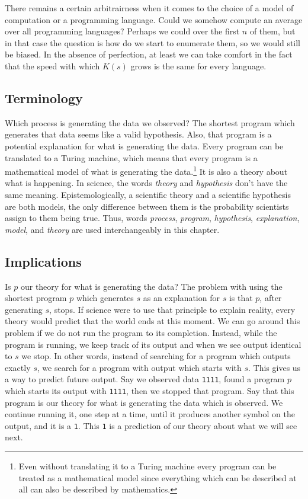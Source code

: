 There remains a certain arbitrairness when it comes to the choice of a model of computation or a programming language.
Could we somehow compute an average over all programming languages?
Perhaps we could over the first $n$ of them, but in that case the question is how do we start to enumerate them, so we would still be biased.
In the absence of perfection, at least we can take comfort in the fact that the speed with which $K(s)$ grows is the same for every language.

\newpage

\subsection{Terminology}

Which process is generating the data we observed?
The shortest program which generates that data seems like a valid hypothesis.
Also, that program is a potential explanation for what is generating the data.
Every program can be translated to a Turing machine, which means that every program is a mathematical model of what is generating the data.\footnote{Even without translating it to a Turing machine every program can be treated as a mathematical model since everything which can be described at all can also be described by mathematics.}
It is also a theory about what is happening.
In science, the words \textit{theory} and \textit{hypothesis} don't have the same meaning.
Epistemologically, a scientific theory and a scientific hypothesis are both models, the only difference between them is the probability scientists assign to them being true.
Thus, words \textit{process}, \textit{program}, \textit{hypothesis}, \textit{explanation}, \textit{model}, and \textit{theory} are used interchangeably in this chapter.

\newpage

\subsection{Implications}

Is $p$ our theory for what is generating the data?
The problem with using the shortest program $p$ which generates $s$ as an explanation for $s$ is that $p$, after generating $s$, stops.
If science were to use that principle to explain reality, every theory would predict that the world ends at this moment.
We can go around this problem if we do not run the program to its completion.
Instead, while the program is running, we keep track of its output and when we see output identical to $s$ we stop.
In other words, instead of searching for a program which outputs exactly $s$, we search for a program with output which starts with $s$.
This gives us a way to predict future output.
Say we observed data \texttt{1111}, found a program $p$ which starts its output with \texttt{1111}, then we stopped that program.
Say that this program is our theory for what is generating the data which is observed.
We continue running it, one step at a time, until it produces another symbol on the output, and it is a \texttt{1}.
This \texttt{1} is a prediction of our theory about what we will see next.

